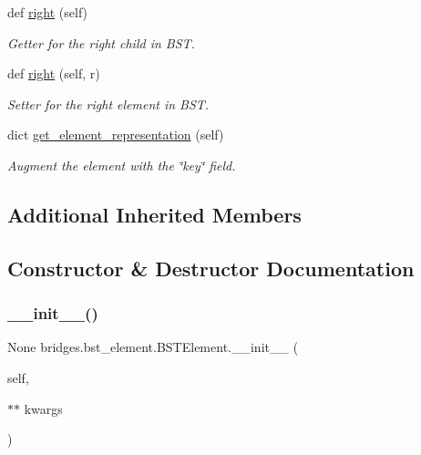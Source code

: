 \begin{DoxyCompactItemize}
$$def \mbox{\hyperlink{classbridges_1_1bst__element_1_1_b_s_t_element_a3ec82fbc56a5e6309b69d2d963b483fd}{right}} (self)
\begin{DoxyCompactList}\small\item\em Getter for the right child in B\+ST. \end{DoxyCompactList}\item 
def \mbox{\hyperlink{classbridges_1_1bst__element_1_1_b_s_t_element_a978ae0db366dee59703ed266eebca0e9}{right}} (self, r)
\begin{DoxyCompactList}\small\item\em Setter for the right element in B\+ST. \end{DoxyCompactList}\item 
dict \mbox{\hyperlink{classbridges_1_1bst__element_1_1_b_s_t_element_a9d038f191a7cf06e75910463a3aa3b80}{get\+\_\+element\+\_\+representation}} (self)
\begin{DoxyCompactList}\small\item\em Augment the element with the \char`\"{}key\char`\"{} field. \end{DoxyCompactList}\end{DoxyCompactItemize}
\subsection*{Additional Inherited Members}


\subsection{Constructor \& Destructor Documentation}
\mbox{\label{classbridges_1_1bst__element_1_1_b_s_t_element_a0be9b75a1da9322d40811669d13e05a4}} 
\subsubsection{\texorpdfstring{\_\_init\_\_()}{\_\_init\_\_()}}
{\footnotesize\ttfamily  None bridges.\+bst\+\_\+element.\+B\+S\+T\+Element.\+\_\+\+\_\+init\+\_\+\+\_\+ (\begin{DoxyParamCaption}\item[{}]{self,  }\item[{$\ast$$\ast$}]{kwargs }\end{DoxyParamCaption})}



